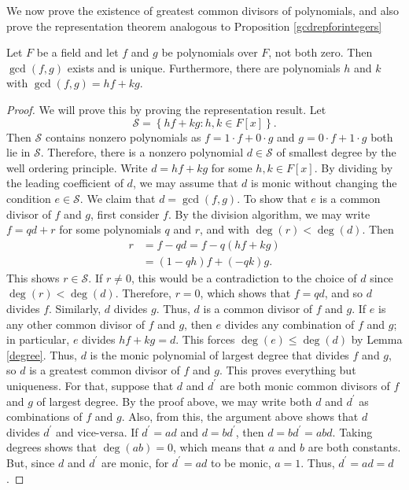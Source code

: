 We now prove the existence of greatest common divisors of polynomials, and
also prove the representation theorem analogous to Proposition
\ref{gcdrepforintegers}

\begin{proposition}
Let $F$ be a field and let $f$ and $g$ be polynomials over $F$, not both zero.
Then $\gcd(f,g)$ exists and is unique. Furthermore, there are polynomials $h$
and $k$ with $\gcd(f,g)=hf+kg$.
\end{proposition}

\begin{proof}
We will prove this by proving the representation result. Let
\[
\mathcal{S}=\left\{  hf+kg:h,k\in F[x]\right\}  .
\]
Then $\mathcal{S}$ contains nonzero polynomials as $f=1\cdot f+0\cdot g$ and
$g=0\cdot f+1\cdot g$ both lie in $\mathcal{S}$. Therefore, there is a nonzero
polynomial $d\in\mathcal{S}$ of smallest degree by the well ordering
principle. Write $d=hf+kg$ for some $h,k\in F[x]$. By dividing by the leading
coefficient of $d$, we may assume that $d$ is monic without changing the
condition $e\in\mathcal{S}$. We claim that $d=\gcd(f,g)$. To show that $e$ is
a common divisor of $f$ and $g$, first consider $f$. By the division
algorithm, we may write $f=qd+r$ for some polynomials $q$ and $r$, and with
$\deg(r)<\deg(d)$. Then
\begin{align*}
r  & =f-qd=f-q(hf+kg)\\
& =(1-qh)f+(-qk)g.
\end{align*}
This shows $r\in\mathcal{S}$. If $r\neq0$, this would be a contradiction to
the choice of $d$ since $\deg(r)<\deg(d)$. Therefore, $r=0$, which shows that
$f=qd$, and so $d$ divides $f$. Similarly, $d$ divides $g$. Thus, $d$ is a
common divisor of $f$ and $g$. If $e$ is any other common divisor of $f$ and
$g$, then $e$ divides any combination of $f$ and $g$; in particular, $e$
divides $hf+kg=d$. This forces $\deg(e)\leq\deg(d)$ by Lemma \ref{degree}.
Thus, $d$ is the monic polynomial of largest degree that divides $f$ and $g$,
so $d$ is a greatest common divisor of $f$ and $g$. This proves everything but
uniqueness. For that, suppose that $d$ and $d^{\prime}$ are both monic common
divisors of $f$ and $g$ of largest degree. By the proof above, we may write
both $d$ and $d^{\prime}$ as combinations of $f$ and $g$. Also, from this, the
argument above shows that $d$ divides $d^{\prime}$ and vice-versa. If
$d^{\prime}=ad$ and $d=bd^{\prime}$, then $d=bd^{\prime}=abd$. Taking degrees
shows that $\deg(ab)=0$, which means that $a$ and $b$ are both constants. But,
since $d$ and $d^{\prime}$ are monic, for $d^{\prime}=ad$ to be monic, $a=1$.
Thus, $d^{\prime}=ad=d$.
\end{proof}


